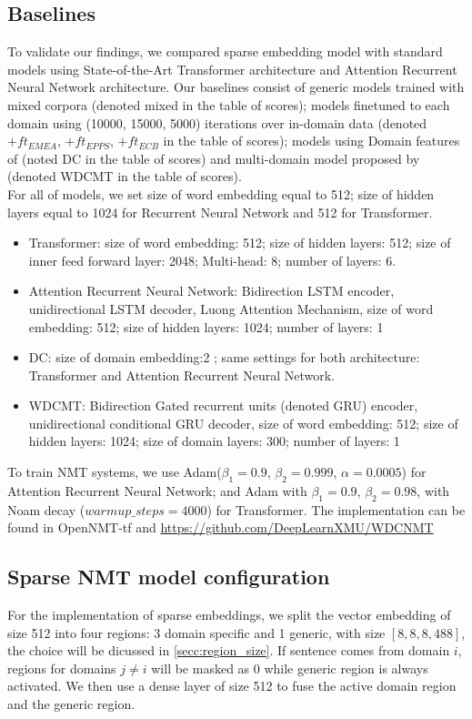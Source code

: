 \documentclass[11pt,a4paper]{article}
\newcommand{\fyTodo}[1]{\Todo[FY:]{\textcolor{orange}{#1}}}
\begin{document}
\subsection{Baselines \label{ssec:baselines}}
To validate our findings, we compared sparse embedding model with standard models using State-of-the-Art Transformer \cite{Vaswani17attention} architecture and Attention Recurrent Neural Network architecture. Our baselines consist of generic models trained with mixed corpora (denoted mixed in the table of scores); models finetuned to each domain using (10000, 15000, 5000) iterations over in-domain data (denoted $+ft_{EMEA}$, $+ft_{EPPS}$, $+ft_{ECB}$ in the table of scores); models using Domain features of \cite{Kobus17domaincontrol} (noted DC in the table of scores) and multi-domain model proposed by \cite{Zeng18multidomain} (denoted WDCMT in the table of scores). \\
For all of models, we set size of word embedding equal to 512; size of hidden layers equal to 1024 for Recurrent Neural Network and 512 for Transformer. 
\begin{itemize}
	\item Transformer: size of word embedding: 512; size of hidden layers: 512; size of inner feed forward layer: 2048; Multi-head: 8; number of layers: 6.
	\item Attention Recurrent Neural Network: Bidirection LSTM encoder, unidirectional LSTM decoder, Luong Attention Mechanism, size of word embedding: 512; size of hidden layers: 1024; number of layers: 1
	\item DC: size of domain embedding:2 ; same settings for both architecture: Transformer and Attention Recurrent Neural Network.
	\item WDCMT: Bidirection Gated recurrent units (denoted GRU) encoder, unidirectional conditional GRU decoder, size of word embedding: 512; size of hidden layers: 1024; size of domain layers: 300; number of layers: 1
\end{itemize}
To train NMT systems, we use Adam($\beta_1=0.9$, $\beta_2 = 0.999$, $\alpha=0.0005$) for Attention Recurrent Neural Network; and Adam with $\beta_1=0.9$, $\beta_2= 0.98$, with Noam decay \cite{Vaswani17attention} ($warmup\_steps=4000$) for Transformer.
The implementation can be found in OpenNMT-tf\cite{Klein2017OpenNMT} and \url{https://github.com/DeepLearnXMU/WDCNMT}
\subsection{Sparse NMT model configuration}
\fyTodo{Motivate the split - discuss experimentally embedding size}
For the implementation of sparse embeddings, we split the vector embedding of size 512 into four regions: 3 domain specific and 1 generic, with size $[8,8,8,488]$, the choice will be dicussed in \ref{secc:region_size}. If sentence comes from domain $i$, regions for domains $j \neq i$ will be masked as 0 while generic region is always activated. We then use a dense layer of size 512 to fuse the active domain region and the generic region.
\end{document}
